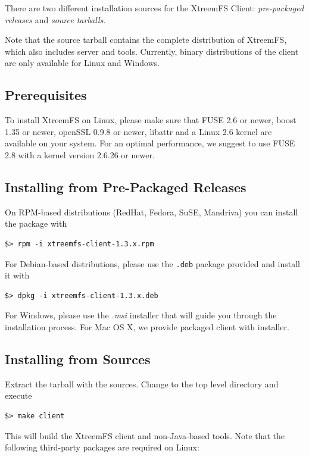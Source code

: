 \documentclass[a4paper,10pt]{book}
\begin{document}
There are two different installation sources for the XtreemFS Client: \emph{pre-packaged releases} and \emph{source tarballs}.

Note that the source tarball contains the complete distribution of XtreemFS, which also includes server and tools. Currently, binary distributions of the client are only available for Linux and Windows.

\subsection{Prerequisites}

To install XtreemFS on Linux, please make sure that FUSE 2.6 or newer, boost 1.35 or newer, openSSL 0.9.8 or newer, libattr and a Linux 2.6 kernel are available on your system. For an optimal performance, we suggest to use FUSE 2.8 with a kernel version 2.6.26 or newer.

\subsection{Installing from Pre-Packaged Releases}

On RPM-based distributions (RedHat, Fedora, SuSE, Mandriva) you can install the package with

\begin{verbatim}
$> rpm -i xtreemfs-client-1.3.x.rpm
\end{verbatim}


For Debian-based distributions, please use the \texttt{.deb} package provided and install it with

\begin{verbatim}
$> dpkg -i xtreemfs-client-1.3.x.deb
\end{verbatim}


For Windows, please use the \emph{.msi} installer that will guide you through the installation process.
For Mac OS X, we provide packaged client with installer.

\subsection{Installing from Sources}

Extract the tarball with the sources. Change to the top level directory and execute

\begin{verbatim}
$> make client
\end{verbatim}

This will build the XtreemFS client and non-Java-based tools. Note that the following third-party packages are required on Linux:
\end{document}

